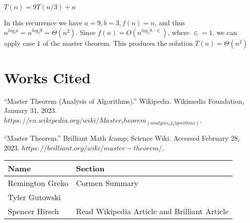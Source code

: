 \documentclass{article}
\begin{document}
\smallskip

\textit{$T(n) = 9T(n/3) + n$}

\smallskip

\noindent In this recurrence we have \textit{$a = 9, b = 3, f(n) = n$}, and thus \textit{$n^{log_{b}a} = n^{log_{3}9} = \Theta(n^2)$}. Since 
\textit{$f(n) = O(n^{log_{3}9 - \in})$}, where \textit{$\in = 1$}, we can apply case 1 of the master theorem. This produces the solution
\textit{$T(n) = \Theta(n^2)$}

\pagebreak
\section{Works Cited}

``Master Theorem (Analysis of Algorithms).'' Wikipedia. Wikimedia Foundation, January 31, 2023. $https://en.wikipedia.org/wiki/Master_theorem_(analysis_of_algorithms)$.

``Master Theorem.'' Brilliant Math \&amp; Science Wiki. Accessed February 28, 2023. $https://brilliant.org/wiki/master-theorem/$. 

\pagebreak

\begin{center}
        \begin{tabular}{|p{3cm}|p{6cm}|}
            \hline
            \textbf{Name} & \textbf{Section} \\
            \hline
            Remington Greko & Cormen Summary\\
            \hline
            Tyler Gutowski & \\
            \hline
            Spencer Hirsch & Read Wikipedia Article and Brilliant Article \\
            \hline
        \end{tabular}
    \end{center}
\end{document}
